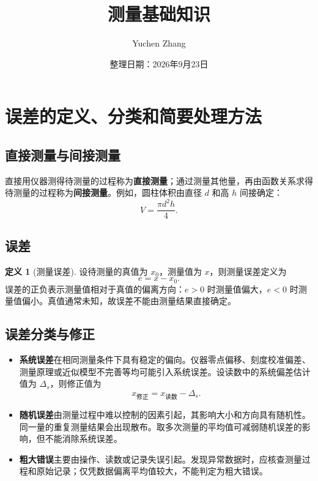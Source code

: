 \documentclass[UTF8, fontset=fandol, a4paper, 12pt]{ctexart}
\title{测量基础知识}
\author{Yuchen Zhang}
\date{整理日期：2026年9月23日}
\makeatletter
\theoremstyle{definition}
\newtheorem{definition}{定义}[section]
\renewcommand{\maketitle}{%
  \begin{center}
    {\LARGE\bfseries \@title\par}\vspace{0.6em}
    \@author\par\vspace{0.2em}
    {\small\@date\par}
  \end{center}}
\makeatother
\begin{document}
\maketitle

\setcounter{section}{1}
\section{误差的定义、分类和简要处理方法}

\subsection*{直接测量与间接测量}

直接用仪器测得待测量的过程称为\textbf{直接测量}；通过测量其他量，再由函数关系求得待测量的过程称为\textbf{间接测量}。例如，圆柱体积由直径 $d$ 和高 $h$ 间接确定：
\[
  V=\frac{\pi d^2h}{4}.
\]

\subsection*{误差}

\begin{definition}[测量误差]
设待测量的真值为 $x_0$，测量值为 $x$，则测量误差定义为
\[
  e=x-x_0.
\]
误差的正负表示测量值相对于真值的偏离方向：$e>0$ 时测量值偏大，$e<0$ 时测量值偏小。真值通常未知，故误差不能由测量结果直接确定。
\end{definition}

\subsection*{误差分类与修正}

\begin{itemize}
  \item \textbf{系统误差}在相同测量条件下具有稳定的偏向。仪器零点偏移、刻度校准偏差、测量原理或近似模型不完善等均可能引入系统误差。设读数中的系统偏差估计值为 $\Delta_s$，则修正值为
  \[
    x_{\mathrm{修正}}=x_{\mathrm{读数}}-\Delta_s.
  \]
  \item \textbf{随机误差}由测量过程中难以控制的因素引起，其影响大小和方向具有随机性。同一量的重复测量结果会出现散布。取多次测量的平均值可减弱随机误差的影响，但不能消除系统误差。
  \item \textbf{粗大错误}主要由操作、读数或记录失误引起。发现异常数据时，应核查测量过程和原始记录；仅凭数据偏离平均值较大，不能判定为粗大错误。
\end{itemize}

\newpage
\end{document}
